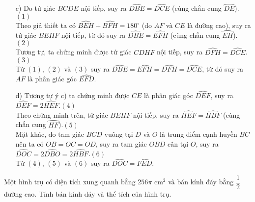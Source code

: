 \begin{bt}
{{
		}
		\begin{enumerate}
			\item[c)] Do tứ giác $BCDE$ nội tiếp, suy ra $\widehat{DBE}=\widehat{DCE}$ (cùng chắn cung $\wideparen{DE}$).\hfill $(1)$\\
			Theo giả thiết ta có $\widehat{BEH}+\widehat{BFH}=180^\circ$ (do $AF$ và $CE$ là đường cao), suy ra tứ giác $BEHF$ nội tiếp, từ đó suy ra $\widehat{DBE}=\widehat{EFH}$ (cùng chắn cung $\wideparen{EH}$).\hfill $(2)$\\
			Tương tự, ta chứng minh được tứ giác $CDHF$ nội tiếp, suy ra $\widehat{DFH}=\widehat{DCE}$.\hfill $(3)$\\
			Từ $(1)$, $(2)$ và $(3)$ suy ra $\widehat{DBE}=\widehat{EFH}=\widehat{DFH}=\widehat{DCE}$, từ đó suy ra $AF$ là phân giác góc $\widehat{EFD}$.
			\item[d)] Tương tự ý c) ta chứng minh được $CE$ là phân giác góc $\widehat{DEF}$, suy ra $\widehat{DEF}=2\widehat{HEF}$.\hfill $(4)$\\
			Theo chứng minh trên, tứ giác $BEHF$ nội tiếp, suy ra $\widehat{HEF}=\widehat{HBF}$ (cùng chắn cung $\wideparen{HF}$).\hfill $(5)$\\
			Mặt khác, do tam giác $BCD$ vuông tại $D$ và $O$ là trung điểm cạnh huyền $BC$ nên ta có $OB=OC=OD$, suy ra tam giác $OBD$ cân tại $O$, suy ra $\widehat{DOC}=2\widehat{DBO}=2\widehat{HBF}$.\hfill $(6)$\\
			Từ $(4)$, $(5)$ và $(6)$ suy ra $\widehat{DOC}=\widehat{FED}$.
		\end{enumerate}
	}
\end{bt}
\begin{bt}%
	Một hình trụ có diện tích xung quanh bằng $256\pi$ cm$^2$ và bán kính đáy bằng $\dfrac{1}{2}$ đường cao. Tính bán kính đáy và thể tích của hình trụ.
\end{bt}
